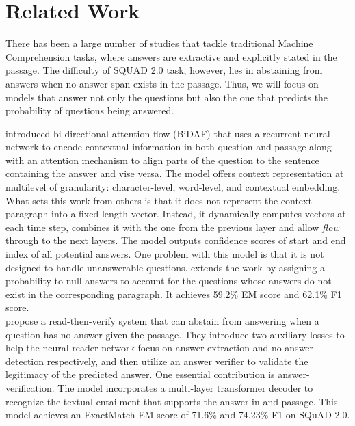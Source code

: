 \section{Related Work}

There has been a large number of studies that tackle traditional Machine Comprehension tasks, where answers are extractive and explicitly stated in the passage. The difficulty of SQUAD 2.0 task, however, lies in abstaining from answers when no answer span exists in the passage. Thus, we will focus on models that answer not only the questions but also the one that predicts the probability of questions being answered.  


\citep{DBLP:journals/corr/SeoKFH16} introduced bi-directional attention flow (BiDAF) that uses a recurrent neural network to encode contextual information in both question and passage along with an attention mechanism to align parts of the question to the sentence containing the answer and vise versa. The model offers context representation at multilevel of granularity: character-level, word-level, and contextual embedding. What sets this work from others is that it does not represent the context paragraph into a fixed-length vector. Instead, it dynamically computes vectors at each time step, combines it with the one from the previous layer and allow \textit{flow} through to the next layers. The model outputs confidence scores of start and end index of all potential answers. One problem with this model is that it is not designed to handle unanswerable questions. \citep{DBLP:journals/corr/LevySCZ17} extends the work by assigning a probability to null-answers to account for the questions whose answers do not exist in the corresponding paragraph. It achieves 59.2\% EM score and 62.1\% F1 score.\\

\citep{DBLP:journals/corr/abs-1808-05759} propose a read-then-verify system that can abstain from answering when a question has no answer given the passage. They introduce two auxiliary losses to help the neural reader network focus on answer extraction and no-answer detection respectively, and then utilize an answer verifier to validate the legitimacy of the predicted answer. One essential contribution is answer-verification. The model incorporates a multi-layer transformer decoder to recognize the textual entailment that supports the answer in and passage. This model achieves an ExactMatch EM score of 71.6\% and 74.23\% F1 on SQuAD 2.0. \\

